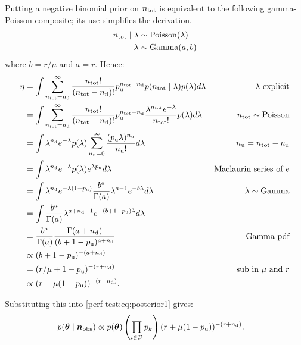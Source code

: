 \documentclass[thesis.tex]{subfiles}
\begin{document}
Putting a negative binomial prior on $n_\text{tot}$ is equivalent to the following gamma-Poisson composite; its use simplifies the derivation.
\begin{align}
n_\text{tot} \mid \lambda &\sim \operatorname{Poisson}(\lambda) \\
\lambda &\sim \operatorname{Gamma}(a, b)
\end{align}
where $b = r / \mu$ and $a = r$.
Hence:
\begin{align}
\eta
&= \int \sum_{n_\text{tot}=n_\text{d}}^\infty \frac{n_\text{tot}!}{(n_\text{tot}-n_\text{d})!} p_\text{u}^{n_\text{tot}-n_\text{d}} p(n_\text{tot} \mid \lambda) p(\lambda) d\lambda &\text{$\lambda$ explicit}\\
&= \int \sum_{n_\text{tot}=n_\text{d}}^\infty \frac{n_\text{tot}!}{(n_\text{tot}-n_\text{d})!} p_\text{u}^{n_\text{tot}-n_\text{d}} \frac{\lambda^{n_\text{tot}} e^{-\lambda}}{n_\text{tot}!} p(\lambda) d\lambda &n_\text{tot} \sim \operatorname{Poisson}\\
&= \int \lambda^{n_\text{d}} e^{-\lambda} p(\lambda) \sum_{n_\text{u}=0}^\infty \frac{(p_\text{u} \lambda)^{n_\text{u}}}{n_\text{u}!} d\lambda &n_\text{u} = n_\text{tot}-n_\text{d}\\
&= \int \lambda^{n_\text{d}} e^{-\lambda} p(\lambda) e^{\lambda p_\text{u}} d\lambda &\text{Maclaurin series of $e$} \\
&= \int \lambda^{n_\text{d}} e^{-\lambda(1 - p_\text{u})} \frac{b^a}{\Gamma(a)} \lambda^{a-1} e^{-b\lambda} d\lambda &\lambda \sim \operatorname{Gamma}\\
&= \int \frac{b^a}{\Gamma(a)} \lambda^{a+n_\text{d}-1} e^{-(b+1-p_\text{u})\lambda} d\lambda \\
&= \frac{b^a}{\Gamma(a)} \frac{\Gamma(a+n_\text{d})}{(b+1-p_\text{u})^{a+n_\text{d}}} &\text{Gamma pdf}\\
&\propto (b+1-p_\text{u})^{-(a+n_\text{d})} \\
&= (r/\mu + 1 - p_\text{u})^{-(r+n_\text{d})} &\text{sub in $\mu$ and $r$}\\
&\propto(r + \mu (1- p_\text{u}))^{-(r+n_\text{d})}.
\end{align}

Substituting this into \cref{perf-test:eq:posterior1} gives:
\begin{align}
p(\bm{\theta} \mid \bm{n}_\text{obs})
&\propto p(\bm{\theta}) \left( \prod_{i \in \mathcal{D}} p_k \right) (r + \mu (1- p_\text{u}))^{-(r+n_\text{d})} \label{perf-test:eq:full-posterior}.
\end{align}
\end{document}
